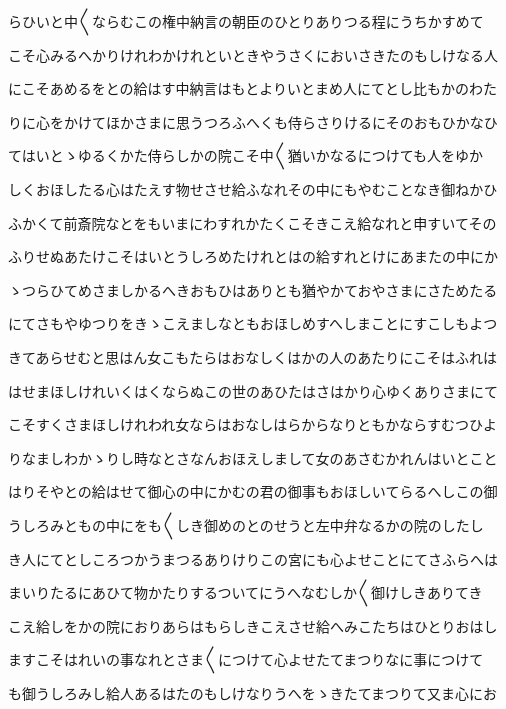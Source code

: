 \documentclass[a4paper,11pt,landscape]{ltjtarticle}
\begin{document}
\par\medskip
らひいと中〱ならむこの権中納言の朝臣のひとりありつる程にうちかすめて
\par\medskip
こそ心みるへかりけれわかけれといときやうさくにおいさきたのもしけなる人
\par\medskip
にこそあめるをとの給はす中納言はもとよりいとまめ人にてとし比もかのわた
\par\medskip
りに心をかけてほかさまに思うつろふへくも侍らさりけるにそのおもひかなひ
\par\medskip
てはいとゝゆるくかた侍らしかの院こそ中〱猶いかなるにつけても人をゆか
\par\medskip
しくおほしたる心はたえす物せさせ給ふなれその中にもやむことなき御ねかひ
\par\medskip
ふかくて前斎院なとをもいまにわすれかたくこそきこえ給なれと申すいてその
\par\medskip
ふりせぬあたけこそはいとうしろめたけれとはの給すれとけにあまたの中にか
\par\medskip
ゝつらひてめさましかるへきおもひはありとも猶やかておやさまにさためたる
\par\medskip
にてさもやゆつりをきゝこえましなともおほしめすへしまことにすこしもよつ
\par\medskip
きてあらせむと思はん女こもたらはおなしくはかの人のあたりにこそはふれは
\par\medskip
はせまほしけれいくはくならぬこの世のあひたはさはかり心ゆくありさまにて
\par\medskip
こそすくさまほしけれわれ女ならはおなしはらからなりともかならすむつひよ
\par\medskip
りなましわかゝりし時なとさなんおほえしまして女のあさむかれんはいとこと
\par\medskip
はりそやとの給はせて御心の中にかむの君の御事もおほしいてらるへしこの御
\par\medskip
うしろみともの中にをも〱しき御めのとのせうと左中弁なるかの院のしたし
\par\medskip
き人にてとしころつかうまつるありけりこの宮にも心よせことにてさふらへは
\par\medskip
まいりたるにあひて物かたりするついてにうへなむしか〱御けしきありてき
\par\medskip
こえ給しをかの院におりあらはもらしきこえさせ給へみこたちはひとりおはし
\par\medskip
ますこそはれいの事なれとさま〱につけて心よせたてまつりなに事につけて
\par\medskip
も御うしろみし給人あるはたのもしけなりうへをゝきたてまつりて又ま心にお
\par\medskip
\end{document}
